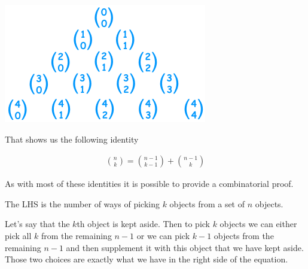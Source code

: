 \documentclass[12pt]{article}
\begin{document}
\includegraphics[scale=0.6]{pascalCombi.png}

That shows us the following identity 

\begin{align*}
\binom{n}{k} = \binom{n-1}{k-1} + \binom{n-1}{k}
\end{align*}

As with most of these identities it is possible to provide a combinatorial proof.

The LHS is the number of ways of picking $k$ objects from a set of $n$ objects.

Let's say that the $k$th object is kept aside. Then to pick $k$ objects we can either pick all $k$ from the remaining $n-1$ or we can pick $k-1$ objects from the remaining $n-1$ and then supplement it with this object that we have kept aside. Those two choices are exactly what we have in the right side of the equation.
\end{document}
